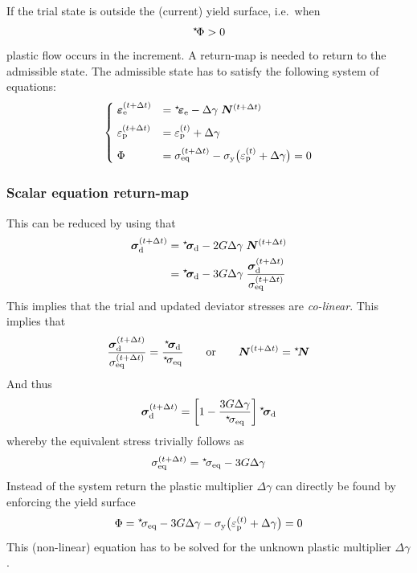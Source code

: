 \documentclass[times,namecite]{goose-article}
\newcommand\leftstar[1]{\hspace*{-.3em}~^\star\!#1}
\begin{document}
If the trial state is outside the (current) yield surface, i.e.\ when
\begin{equation}
  \leftstar{\Phi} > 0
\end{equation}
plastic flow occurs in the increment. A return-map is needed to return to the admissible state. The admissible state has to satisfy the following system of equations:
\begin{equation}
\begin{cases}
  \; \bm{\varepsilon}_\mathrm{e}^{(t+\Delta t)}
    &= \leftstar\bm{\varepsilon}_\mathrm{e}
     - \Delta \gamma \; \bm{N}^{(t+\Delta t)}
  \\[2mm]
  \; \varepsilon_\mathrm{p}^{(t+\Delta t)}
    &= \varepsilon_\mathrm{p}^{(t)} + \Delta \gamma
  \\[2mm]
  \; \Phi
    &= \sigma_\mathrm{eq}^{(t+\Delta t)}
     - \sigma_\mathrm{y} \big( \varepsilon_\mathrm{p}^{(t)} + \Delta\gamma \big)
     = 0
\end{cases}
\end{equation}

\subsubsection{Scalar equation return-map}

This can be reduced by using that
\begin{align}
  \bm{\sigma}_\mathrm{d}^{(t+\Delta t)}
  &= \leftstar{\bm{\sigma}}_\mathrm{d}
   - 2 G \Delta \gamma \; \bm{N}^{(t+\Delta t)}
  \\
  &= \leftstar{\bm{\sigma}}_\mathrm{d}
   - 3 G \Delta \gamma \;
   \frac{
     \bm{\sigma}_\mathrm{d}^{(t+\Delta t)}
   }{
     \sigma_\mathrm{eq}^{(t+\Delta t)}
   }
\end{align}
This implies that the trial and updated deviator stresses are \emph{co-linear}. This implies that
\begin{equation}
  \frac{\bm{\sigma}_\mathrm{d}^{(t+\Delta t)}}{\sigma_\mathrm{eq}^{(t+\Delta t)}}
  = \frac{\leftstar{\bm{\sigma}}_\mathrm{d}}{\leftstar{\sigma}_\mathrm{eq}}
  \qquad
  \text{or}
  \qquad
  \bm{N}^{(t+\Delta t)}
  = \leftstar{\bm{N}}
\end{equation}
And thus
\begin{equation}
  \bm{\sigma}_\mathrm{d}^{(t+\Delta t)}
  = \left[ 1 - \frac{3 G \Delta \gamma}{\leftstar{\sigma}_\mathrm{eq}} \right]
    \leftstar{\bm{\sigma}}_\mathrm{d}
\end{equation}
whereby the equivalent stress trivially follows as
\begin{equation}
  \sigma_\mathrm{eq}^{(t+\Delta t)} =
  \leftstar{\sigma}_\mathrm{eq} - 3 G \Delta \gamma
\end{equation}
Instead of the system return the plastic multiplier $\Delta \gamma$ can directly be found by enforcing the yield surface
\begin{equation}
\label{eq:return-scalar}
  \Phi
  = \leftstar{\sigma}_\mathrm{eq}
  - 3 G \Delta \gamma
  - \sigma_\mathrm{y} \big( \varepsilon_\mathrm{p}^{(t)} + \Delta \gamma \big)
  = 0
\end{equation}
This (non-linear) equation has to be solved for the unknown plastic multiplier $\Delta \gamma$.
\end{document}
